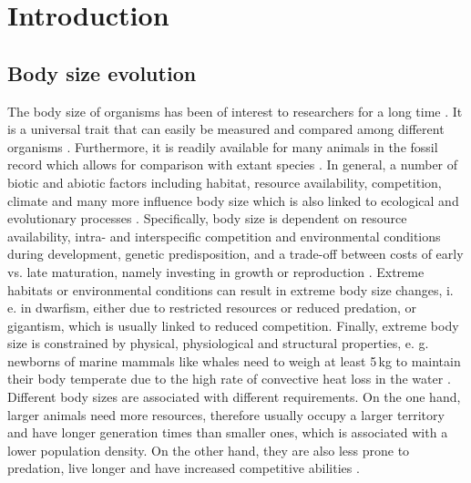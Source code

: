 \section{Introduction}
\subsection{Body size evolution}

The body size of organisms has been of interest to researchers for a long time \citep{Haldane1928,Peters1983}. It is a universal trait that can easily be measured and compared among different organisms \citep{.}. Furthermore, it is readily available for many animals in the fossil record which allows for comparison with extant species \citep{.}. In general, a number of biotic and abiotic factors including habitat, resource availability, competition, climate and many more influence body size which is also linked to ecological and evolutionary processes \citep{Blackburn1994a,Blueweiss1978,Smith2009}.
Specifically, body size is dependent on resource availability, intra- and interspecific competition and environmental conditions during development, genetic predisposition, and a trade-off between costs of early vs. late maturation, namely investing in growth or reproduction \citep{Stearns2000}. Extreme habitats or environmental conditions can result in extreme body size changes, i. e. in dwarfism, either due to restricted resources or reduced predation, or gigantism, which is usually linked to reduced competition. Finally, extreme body size is constrained by physical, physiological and structural properties, e. g. newborns of marine mammals like whales need to weigh at least 5\,kg to maintain their body temperate due to the high rate of convective heat loss in the water \citep{Downhower1988,Smith2016}.
Different body sizes are associated with different requirements. On the one hand, larger animals need more resources, therefore usually occupy a larger territory and have longer generation times than smaller ones, which is associated with a lower population density. On the other hand, they are also less prone to predation, live longer and have increased competitive abilities \citep{Stearn2000, Smith2016}. 


